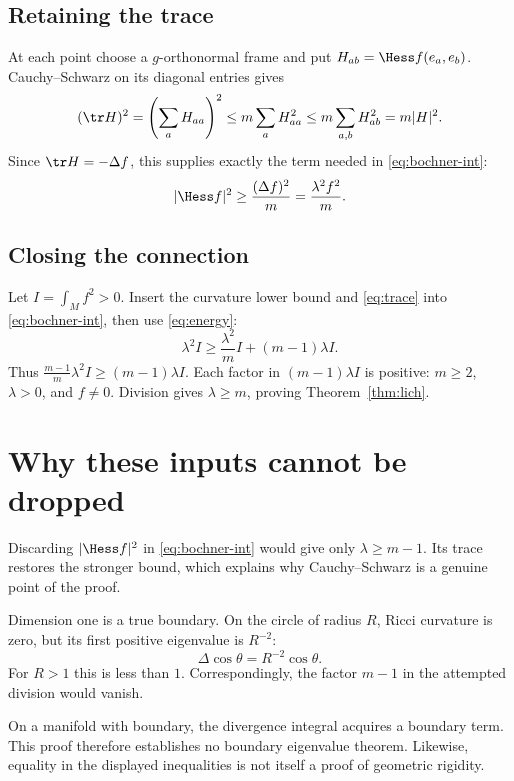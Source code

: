 \documentclass[12pt,reqno]{amsart}
\begin{document}
\subsection*{Retaining the trace}
At each point choose a $g$-orthonormal frame and put
$H_{ab}=\Hess f(e_a,e_b)$. Cauchy--Schwarz on its diagonal entries gives
\[
 (\tr H)^2=\left(\sum_a H_{aa}\right)^2
 \leq m\sum_a H_{aa}^2\leq m\sum_{a,b}H_{ab}^2=m|H|^2.
\]
Since $\tr H=-\Delta f$, this supplies exactly the term needed in
\eqref{eq:bochner-int}:
\begin{equation}\label{eq:trace}
 |\Hess f|^2\geq\frac{(\Delta f)^2}{m}
                    =\frac{\lambda^2f^2}{m}.
\end{equation}

\subsection*{Closing the connection}
Let $I=\int_Mf^2>0$. Insert the curvature lower bound and
\eqref{eq:trace} into \eqref{eq:bochner-int}, then use \eqref{eq:energy}:
\[
 \lambda^2I\geq\frac{\lambda^2}{m}I+(m-1)\lambda I.
\]
Thus $\frac{m-1}{m}\lambda^2I\geq(m-1)\lambda I$. Each factor in
$(m-1)\lambda I$ is positive: $m\geq2$, $\lambda>0$, and $f\ne0$.
Division gives $\lambda\geq m$, proving Theorem~\ref{thm:lich}.

\section{Why these inputs cannot be dropped}
Discarding $|\Hess f|^2$ in \eqref{eq:bochner-int} would give only
$\lambda\geq m-1$. Its trace restores the stronger bound, which explains
why Cauchy--Schwarz is a genuine point of the proof.

Dimension one is a true boundary. On the circle of radius $R$, Ricci
curvature is zero, but its first positive eigenvalue is $R^{-2}$:
\[
 \Delta\cos\theta=R^{-2}\cos\theta.
\]
For $R>1$ this is less than $1$. Correspondingly, the factor $m-1$
in the attempted division would vanish.

On a manifold with boundary, the divergence integral acquires a boundary
term. This proof therefore establishes no boundary eigenvalue theorem.
Likewise, equality in the displayed inequalities is not itself a proof
of geometric rigidity.



\end{document}
